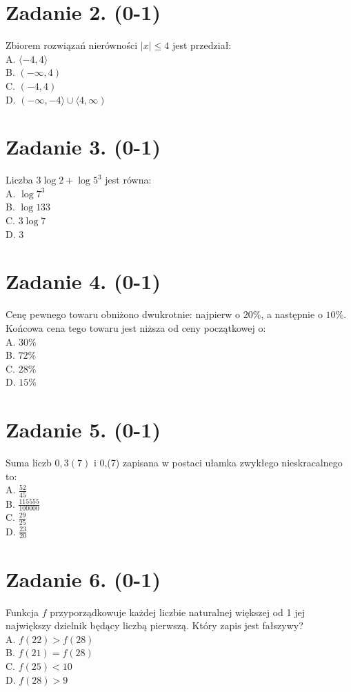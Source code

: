 \documentclass[10pt]{article}
\begin{document}
\section*{Zadanie 2. (0-1)}
Zbiorem rozwiązań nierówności \(|x| \leq 4\) jest przedział:\\
A. \(\langle-4,4\rangle\)\\
B. \((-\infty, 4)\)\\
C. \((-4,4)\)\\
D. \((-\infty,-4\rangle \cup\langle 4, \infty)\)

\section*{Zadanie 3. (0-1)}
Liczba \(3 \log 2+\log 5^{3}\) jest równa:\\
A. \(\log 7^{3}\)\\
B. \(\log 133\)\\
C. \(3 \log 7\)\\
D. 3

\section*{Zadanie 4. (0-1)}
Cenę pewnego towaru obniżono dwukrotnie: najpierw o \(20 \%\), a następnie o \(10 \%\). Końcowa cena tego towaru jest niższa od ceny początkowej o:\\
A. \(30 \%\)\\
B. \(72 \%\)\\
C. \(28 \%\)\\
D. \(15 \%\)

\section*{Zadanie 5. (0-1)}
Suma liczb \(0,3(7)\) i 0,(7) zapisana w postaci ułamka zwykłego nieskracalnego to:\\
A. \(\frac{52}{45}\)\\
B. \(\frac{115555}{100000}\)\\
C. \(\frac{29}{25}\)\\
D. \(\frac{23}{20}\)

\section*{Zadanie 6. (0-1)}
Funkcja \(f\) przyporządkowuje każdej liczbie naturalnej większej od 1 jej największy dzielnik będący liczbą pierwszą. Który zapis jest fałszywy?\\
A. \(f(22)>f(28)\)\\
B. \(f(21)=f(28)\)\\
C. \(f(25)<10\)\\
D. \(f(28)>9\)
\end{document}
